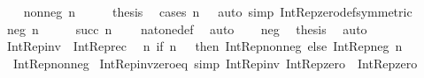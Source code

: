 \begin{isabellebody}
\ \ \isamarkupfalse%
\ {\isacharparenleft}{\kern0pt}nonneg\ n{\isacharparenright}{\kern0pt}\isanewline
\ \ \isamarkupfalse%
\ \isamarkupfalse%
\ {\isacharquery}{\kern0pt}thesis\ \isamarkupfalse%
\ {\isacharparenleft}{\kern0pt}cases\ {\isachardoublequoteopen}n\ {\isacharequal}{\kern0pt}\ {}{\isachardoublequoteclose}{\isacharparenright}{\kern0pt}\ {\isacharparenleft}{\kern0pt}auto\ simp{\isacharcolon}{\kern0pt}\ Int{\isacharunderscore}{\kern0pt}Rep{\isacharunderscore}{\kern0pt}zero{\isacharunderscore}{\kern0pt}def{\isacharbrackleft}{\kern0pt}symmetric{\isacharbrackright}{\kern0pt}{\isacharparenright}{\kern0pt}\isanewline
{}\isamarkupfalse%
\isanewline
\ \ \isamarkupfalse%
\ {\isacharparenleft}{\kern0pt}neg\ n{\isacharparenright}{\kern0pt}\isanewline
\ \ \isamarkupfalse%
\ \isamarkupfalse%
\ {\isachardoublequoteopen}succ\ n\ {\isasymnoteq}\ {}{\isachardoublequoteclose}\ \isamarkupfalse%
\ nat{\isacharunderscore}{\kern0pt}one{\isacharunderscore}{\kern0pt}def\ \isamarkupfalse%
\ auto\isanewline
\ \ \isamarkupfalse%
\ neg\ \isamarkupfalse%
\ {\isacharquery}{\kern0pt}thesis\ \isamarkupfalse%
\ auto\isanewline
{}\isamarkupfalse%
%
\endisatagproof
{\isafoldproof}%
%
\isadelimproof
\isanewline
%
\endisadelimproof
\isanewline
{}\isamarkupfalse%
\ {\isachardoublequoteopen}Int{\isacharunderscore}{\kern0pt}Rep{\isacharunderscore}{\kern0pt}inv\ {\isasymequiv}\ Int{\isacharunderscore}{\kern0pt}Rep{\isacharunderscore}{\kern0pt}rec\isanewline
\ \ {\isacharparenleft}{\kern0pt}{\isasymlambda}n{\isachardot}{\kern0pt}\ {\isacharparenleft}{\kern0pt}if\ n\ {\isacharequal}{\kern0pt}\ {}\ then\ Int{\isacharunderscore}{\kern0pt}Rep{\isacharunderscore}{\kern0pt}nonneg\ else\ Int{\isacharunderscore}{\kern0pt}Rep{\isacharunderscore}{\kern0pt}neg{\isacharparenright}{\kern0pt}\ n{\isacharparenright}{\kern0pt}\isanewline
\ \ Int{\isacharunderscore}{\kern0pt}Rep{\isacharunderscore}{\kern0pt}nonneg{\isachardoublequoteclose}\isanewline
\isanewline
\isanewline
\isanewline
\isanewline
{}\isamarkupfalse%
\ Int{\isacharunderscore}{\kern0pt}Rep{\isacharunderscore}{\kern0pt}inv{\isacharunderscore}{\kern0pt}zero{\isacharunderscore}{\kern0pt}eq\ {\isacharbrackleft}{\kern0pt}simp{\isacharbrackright}{\kern0pt}{\isacharcolon}{\kern0pt}\ {\isachardoublequoteopen}Int{\isacharunderscore}{\kern0pt}Rep{\isacharunderscore}{\kern0pt}inv\ Int{\isacharunderscore}{\kern0pt}Rep{\isacharunderscore}{\kern0pt}zero\ {\isacharequal}{\kern0pt}\ Int{\isacharunderscore}{\kern0pt}Rep{\isacharunderscore}{\kern0pt}zero{\isachardoublequoteclose}\isanewline

\end{isabellebody}
